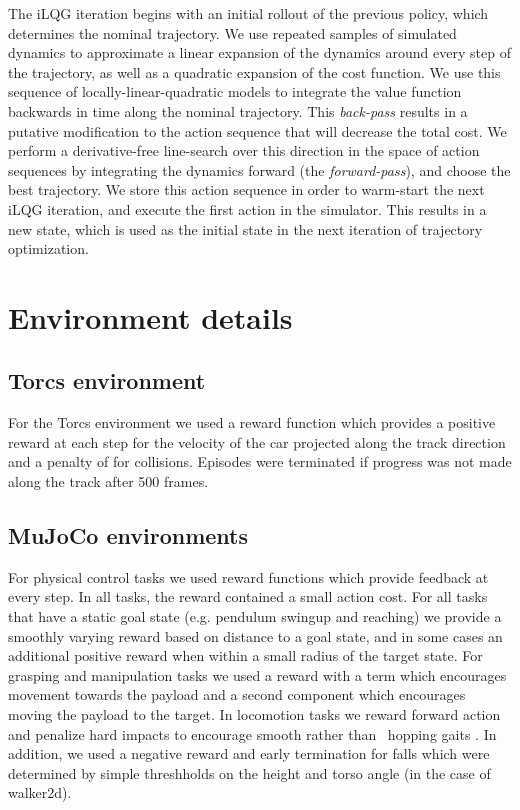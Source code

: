 \documentclass{article} \usepackage{iclr2016_conference,times}
\begin{document}
The iLQG iteration begins with an initial rollout of the previous
policy, which determines the nominal trajectory.  We use repeated
samples of simulated dynamics to approximate a linear expansion of the
dynamics around every step of the trajectory, as well as a quadratic
expansion of the cost function.  We use this sequence of
locally-linear-quadratic models to integrate the value function
backwards in time along the nominal trajectory.  This \emph{back-pass}
results in a putative modification to the action sequence that will
decrease the total cost.  We perform a derivative-free line-search
over this direction in the space of action sequences by integrating
the dynamics forward (the \emph{forward-pass}), and choose the best
trajectory.  We store this action sequence in order to warm-start the
next iLQG iteration, and execute the first action in the simulator.
This results in a new state, which is used as the initial state in the
next iteration of trajectory optimization.
\section{Environment details}



\subsection{Torcs environment}

For the Torcs environment we used a reward function
which provides a positive reward at each step for the velocity
of the car projected along the track direction and a penalty
of  for collisions. Episodes were terminated
if progress was not made along the track after 500
frames.


\subsection{MuJoCo environments}

For physical control tasks we used reward functions which
provide feedback at every step. In all tasks, the reward contained a small
action cost. For all tasks that have a static goal state (e.g. pendulum
swingup and reaching) we provide a smoothly varying reward based
on distance to a goal state, and in some cases an additional positive
reward when within a small radius of the target state.
For grasping and manipulation tasks we used a reward with a
term which encourages movement towards the payload
and a second component which encourages moving the payload to the target.
In locomotion tasks we reward forward action and
penalize hard impacts to encourage smooth rather than \
hopping gaits \citep{schulman2015trust}. In addition,
we used a negative reward and early termination for falls
which were determined by simple threshholds on the height and
torso angle (in the case of walker2d).
\end{document}
